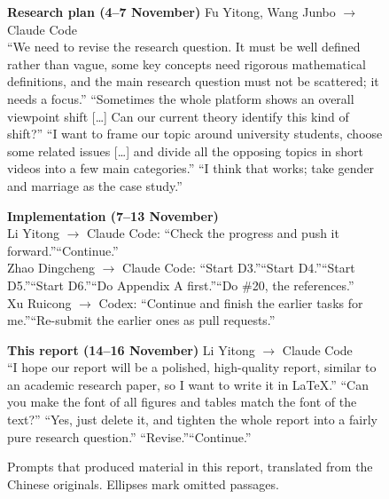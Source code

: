 \begin{figure}[H]
\begin{tcolorbox}[enhanced,colback=panel,colframe=rule,boxrule=0.5pt,arc=2pt,left=8pt,right=8pt,top=5pt,bottom=5pt,fontupper=\small]
\setlength{\parskip}{3pt}
\textbf{Research plan (4--7 November)} \textcolor{mute}{Fu Yitong, Wang Junbo $\to$ Claude Code}\\
``We need to revise the research question. It must be well defined rather than vague, some key concepts need rigorous mathematical definitions, and the main research question must not be scattered; it needs a focus.''\quad
``Sometimes the whole platform shows an overall viewpoint shift [\ldots] Can our current theory identify this kind of shift?''\quad
``I want to frame our topic around university students, choose some related issues [\ldots] and divide all the opposing topics in short videos into a few main categories.''\quad
``I think that works; take gender and marriage as the case study.''

\textbf{Implementation (7--13 November)}\\
\textcolor{mute}{Li Yitong $\to$ Claude Code:} ``Check the progress and push it forward.''\quad ``Continue.''\\
\textcolor{mute}{Zhao Dingcheng $\to$ Claude Code:} ``Start D3.''\quad ``Start D4.''\quad ``Start D5.''\quad ``Start D6.''\quad ``Do Appendix A first.''\quad ``Do \#20, the references.''\\
\textcolor{mute}{Xu Ruicong $\to$ Codex:} ``Continue and finish the earlier tasks for me.''\quad ``Re-submit the earlier ones as pull requests.''

\textbf{This report (14--16 November)} \textcolor{mute}{Li Yitong $\to$ Claude Code}\\
``I hope our report will be a polished, high-quality report, similar to an academic research paper, so I want to write it in \LaTeX{}.''\quad
``Can you make the font of all figures and tables match the font of the text?''\quad
``Yes, just delete it, and tighten the whole report into a fairly pure research question.''\quad
``Revise.''\quad ``Continue.''
\end{tcolorbox}
\vspace{-4pt}
\caption{Prompts that produced material in this report, translated from the Chinese originals. Ellipses mark omitted passages.}
\label{fig:prompts}
\end{figure}
